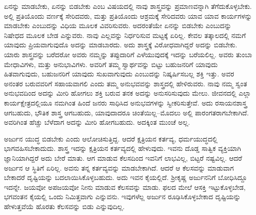 ಏನನ್ನು ಮಾಡಬೇಕು, ಏನನ್ನು ಬಿಡಬೇಕು ಎಂಬ ವಿಷಯದಲ್ಲಿ ನಾವು ಶಾಸ್ತ್ರವನ್ನು ಪ್ರಮಾಣ\-ವನ್ನಾಗಿ ತೆಗೆದುಕೊಳ್ಳಬೇಕು. ಅಲ್ಲಿ ಪ್ರತಿಯೊಂದು ವರ್ಣಕ್ಕೆ ಸೇರಿದವರು, ಮತ್ತು ಪ್ರತಿಯೊಂದು ಆಶ್ರಮಕ್ಕೆ ಸೇರಿದವರು ಯಾವ ಯಾವ ಕಾರ್ಯಗಳನ್ನು ಮಾಡಬೇಕು ಎಂಬುದನ್ನು ವಿಧಿಯ ಮೂಲಕ ವಿವರಿಸುವರು. ಅದರಂತೆಯೇ ಏನನ್ನು ಬಿಡಬೇಕು ಎಂಬುದನ್ನು ನಿಷೇಧದ ಮೂಲಕ ಬೇಡ ಎನ್ನುವರು. ನಾವು ಎಲ್ಲವನ್ನು ನಿರ್ಧರಿಸುವ ಮಟ್ಟಕ್ಕೆ ಏರಿಲ್ಲ. ಕೇವಲ ತತ್ಕಾಲದಲ್ಲಿ ನಮಗೆ ಯಾವುದು ಪ್ರಿಯವಾಗುವುದೊ ಅದನ್ನು ಮಾಡಬಾರದು. ಅದು ಶಾಸ್ತ್ರಕ್ಕೆ ವಿರೋಧವಾಗಿದ್ದರೆ ಅದನ್ನು ಬಿಡಬೇಕು. ಯಾರು ಶಾಸ್ತ್ರವನ್ನು ಬರೆದರೋ ಅವರು ನಮ್ಮನ್ನು ತಪ್ಪುದಾರಿಗೆ ಎಳೆಯುವುದಕ್ಕೆ ಇದನ್ನು ಬರೆಯಲಿಲ್ಲ. ಅವರು ತುಂಬಾ ಮೇಧಾವಿಗಳು, ಮತ್ತು ಅನುಭಾವಿಗಳು. ಅವರಿಗೆ ತಮ್ಮ ಸ್ವಾರ್ಥವನ್ನು ಬಿಟ್ಟು ಬಹುಜನರಿಗೆ ಯಾವುದು ಹಿತವಾಗುವುದು, ಬಹುಜನರಿಗೆ ಯಾವುದು ಸುಖವಾಗುವುದು ಎಂಬುದನ್ನು ನಿಷ್ಕರ್ಷಿಸಬಲ್ಲ ಶಕ್ತಿ ಇತ್ತು. ಅವರ ಅನಂತರ ಬರುವವರಿಗೆ ಸಹಾಯವಾಗಲಿ ಎಂದು ತಮ್ಮ ಅನುಭವವನ್ನು ಶಾಸ್ತ್ರದಲ್ಲಿ ಹೇಳಿರುವರು. ನಾವು ನಮ್ಮ ಸ್ವಂತ ಅನುಭವದಿಂದ ಅದನ್ನು ಮೀರಿ ಹೋಗಲು ಶಕ್ತಿ ಬರುವ ತನಕ ಅದನ್ನು ಅನುಸರಿಸುವುದು ಮೇಲು. ಜೀವನದಲ್ಲಿ ಎಲ್ಲಾ ಕಾರ್ಯಕ್ಷೇತ್ರದಲ್ಲಿಯೂ ನಮಗಿಂತ ಹಿಂದೆ ಜನರು ಸಾಧಿಸಿದ ಅನುಭವಗಳನ್ನು ಸ್ವೀಕರಿಸುತ್ತೇವೆ. ಅದು ರಸಾಯನಶಾಸ್ತ್ರ ಆಗಬಹುದು, ಭೌತಿಕ ಶಾಸ್ತ್ರ ಆಗಬಹುದು, ಯಾವುದಾದರೂ ಚಿಂತೆಯಿಲ್ಲ–ಮೊದಲು ಅಲ್ಲಿ ಪಾರಂಗತರಾಗಬೇಕಾಗಿದೆ. ಅವರಿಗಿಂತ ಹೆಚ್ಚು ಬೆಳೆದಾಗ ಅದನ್ನು ಮೀರಿ ಹೋಗಬಹುದು. ಅದಕ್ಕಿಂತ ಮುಂಚೆ ಅಲ್ಲ.

\newpage

ಅರ್ಜುನ ಯುದ್ಧ ಬಿಡಬೇಕು ಎಂದು ಆಲೋಚಿಸುತ್ತಿದ್ದ. ಆದರೆ ಕ್ಷತ್ರಿಯನ ಕರ್ತವ್ಯ, ಧರ್ಮಯುದ್ಧದಲ್ಲಿ ಭಾಗವಹಿಸಬೇಕಾದುದು. ಶಾಸ್ತ್ರ ಇದನ್ನು ಕ್ಷತ್ರಿಯನ ಕರ್ತವ್ಯದಲ್ಲಿ ಹೇಳುವುದು. ಇವನು ದೊಡ್ಡ ಸಾತ್ವಿಕ ವ್ಯಕ್ತಿಯಾಗಿ ಜ್ಞಾನಿಯಾಗಿದ್ದರೆ ಅದು ಬೇರೆ ಮಾತು. ಆಗ ಮಾಡುವ ಕೆಲಸದಿಂದ ಇವನಿಗೆ ಲಾಭವಿಲ್ಲ, ಬಿಟ್ಟರೆ ನಷ್ಟವಿಲ್ಲ. ಆದರೆ ಅರ್ಜುನ ಆ ಸ್ಥಿತಿಗೆ ಏರಿಲ್ಲ. ಅವನು ತನ್ನ ಕರ್ತವ್ಯವನ್ನು ಮಾಡಬೇಕಾಗಿದೆ. ಆದರೆ ಆ ಕೆಲಸವನ್ನು ಮಾಡುವಾಗ ಬೇಕಾದರೆ ದೃಷ್ಟಿಯನ್ನು ಬದಲಾಯಿಸಿಕೊಳ್ಳಬಹುದು. ಅದು ಇವನ ಕೈಯಲ್ಲಿದೆ. ಶ‍್ರೀಕೃಷ್ಣ ಅರ್ಜುನನಿಗೆ ಬೋಧಿಸಿದ್ದೂ ಇದನ್ನೇ. ಜಯವೋ ಅಪಜಯವೋ ನೀನು ಮಾಡುವ ಕೆಲಸವನ್ನು ಮಾಡು. ಫಲದ ಮೇಲೆ ಆಸಕ್ತಿ ಇಟ್ಟುಕೊಳ್ಳಬೇಡ, ಭಗವಂತನ ಕೈಯಲ್ಲಿ ಒಂದು ನಿಮಿತ್ತವಾಗು ಎನ್ನುವನು. ಇವುಗಳೆಲ್ಲ ಅರ್ಜುನ ರೂಢಿಸಿಕೊಳ್ಳಬೇಕಾದ ದೃಷ್ಟಿಯನ್ನು ಹೇಳುತ್ತವೆಯೆ ಹೊರತು ಕೆಲಸವನ್ನು ಬಿಡು ಎನ್ನುವುದಿಲ್ಲ.

